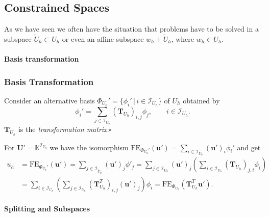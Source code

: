 \subsection{Constrained Spaces}

As we have seen we often have the situation that problems have to be solved in a
subspace $\tilde{U}_h\subset U_h$ or even an affine subspace
$w_h+\tilde{U}_h$, where $w_h\in U_h$.

\paragraph{Basis transformation} 

\begin{frame}
\frametitle<presentation>{Basis Transformation}
\begin{Def} Consider an alternative basis
$\Phi_{U_h}'=\{\phi_i'\,|\, i\in \mathcal{I}_{U_h}\}$ of $U_h$
obtained by
\begin{equation}
\phi_i' = \sum_{j\in\mathcal{I}_{U_h}}
\left(\mathbf{T}_{U_h}\right)_{i,j} \phi_j, \qquad i\in \mathcal{I}_{U_h}.
\end{equation}
$\mathbf{T}_{U_h}$ is the \textit{transformation matrix}.\hfill$\square$
\end{Def}
For $\mathbf{U}'=\mathbb{K}^{\mathcal{I}_{U_h}}$ we have the isomorphism
$\text{FE}_{\Phi_{U_h}'}(\mathbf{u}') = \sum_{i\in\mathcal{I}_{U_h}}
(\mathbf{u}')_i \phi_i'$ and get
\begin{equation}
\begin{split}
u_h &= \text{FE}_{\Phi_{U_h}'}(\mathbf{u}') = 
\sum_{j\in\mathcal{I}_{\tilde{U}_h}} (\mathbf{u}')_j \phi'_j = 
\sum_{j\in\mathcal{I}_{U_h}} (\mathbf{u}')_j \left (
\sum_{i\in\mathcal{I}_{U_h}}
\left(\mathbf{T}_{U_h}\right)_{j,i} \phi_i \right)\\
&= \sum_{i\in \mathcal{I}_{U_h}} \left (\sum_{j\in\mathcal{I}_{U_h}}
\left(\mathbf{T}^T_{U_h}\right)_{i,j} (\mathbf{u}')_j \right ) \phi_i
= \text{FE}_{\Phi_{U_h}}\left( \mathbf{T}^T_{U_h} \mathbf{u}' \right) .
\end{split}
\end{equation}
\end{frame}

\paragraph{Splitting and Subspaces} 

